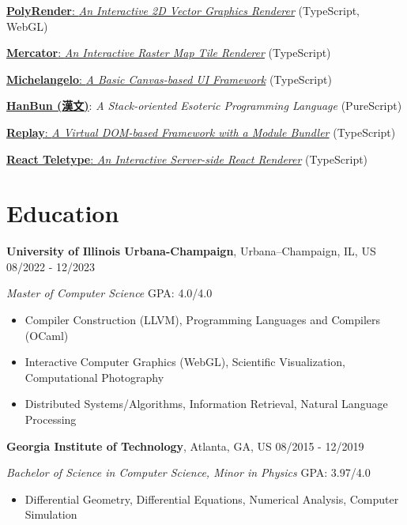 \documentclass[12pt]{article}
\begin{document}
\href{https://galmungral.github.io/polyrender}{\textbf{PolyRender}: \textit{An Interactive 2D Vector Graphics Renderer}} \hfill (TypeScript, WebGL)

\href{https://galmungral.github.io/mercator?lon=-73.9855&lat=40.7580}{\textbf{Mercator}: \textit{An Interactive Raster Map Tile Renderer}} \hfill (TypeScript)

\href{https://galmungral.github.io/michelangelo}{\textbf{Michelangelo}: \textit{A Basic Canvas-based UI Framework}} \hfill (TypeScript)

\href{https://galmungral.github.io/hanbun-lang}{\textbf{HanBun ({\cjkfont 漢文})}}: \textit{A Stack-oriented Esoteric Programming Language} \hfill (PureScript)

\href{https://github.com/galmungral/replay}{\textbf{Replay}: \textit{A Virtual DOM-based Framework with a Module Bundler}} \hfill (TypeScript)

\href{https://github.com/galmungral/react-teletype}{\textbf{React Teletype}: \textit{An Interactive Server-side React Renderer}} \hfill (TypeScript)

\section*{Education}

\textbf{University of Illinois Urbana-Champaign}, Urbana–Champaign, IL, US \hfill 08/2022 - 12/2023 

\textit{Master of Computer Science}  \hfill GPA: 4.0/4.0 
\begin{itemize}
\item Compiler Construction (LLVM), Programming Languages and Compilers (OCaml)
\item Interactive Computer Graphics (WebGL), Scientific Visualization, Computational Photography
\item Distributed Systems/Algorithms, Information Retrieval, Natural Language Processing
\end{itemize}


\vspace{1em}
\textbf{Georgia Institute of Technology}, Atlanta, GA, US \hfill 08/2015 - 12/2019

\textit{Bachelor of Science in Computer Science, Minor in Physics} \hfill GPA: 3.97/4.0


\begin{itemize}
\item Differential Geometry, Differential Equations, Numerical Analysis, Computer Simulation
\end{itemize}
\end{document}
